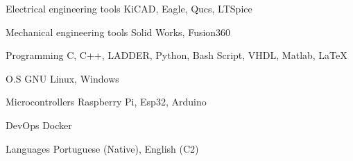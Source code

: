 

\begin{cvskills}

  \cvskill
    {Electrical engineering tools} %
    {KiCAD, Eagle, Qucs, LTSpice} %

  \cvskill
    {Mechanical engineering tools} %
    {Solid Works, Fusion360} %

  \cvskill
    {Programming} %
    {C, C++, LADDER, Python, Bash Script, VHDL, Matlab, LaTeX} %

  \cvskill
    {O.S} %
    {GNU Linux, Windows} %

  \cvskill
    {Microcontrollers} %
    {Raspberry Pi, Esp32, Arduino} %

  \cvskill
    {DevOps} %
    {Docker} %

  \cvskill
    {Languages} %
    {Portuguese (Native), English (C2)} %

\end{cvskills}
